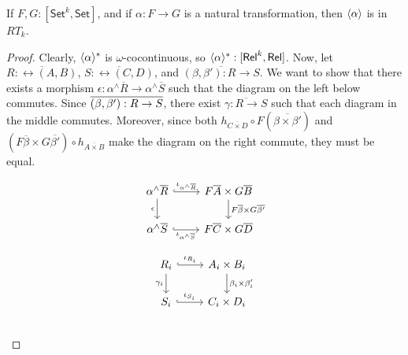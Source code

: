 \documentclass[runningheads]{llncs}
\newcommand{\set}{\mathsf{Set}}
\begin{document}
\begin{lemma}\label{lem:graph-reln-functors}
If $F,G : [\set^k,\set]$, and if $\alpha : F \to G$ is a natural
transformation, then $\langle {\alpha} \rangle$ is in $RT_k$.
\end{lemma}
\begin{proof}
Clearly, $\langle {\alpha} \rangle^*$ is $\omega$-cocontinuous, so
$\langle {\alpha} \rangle^* : [\mathsf{Rel}^k,\mathsf{Rel}]$. Now, let $\overline{R :
  \rel(A, B)}$, $\overline{S : \rel(C, D)}$, and $\overline{(\beta,
  \beta') : R \to S}$. We want to show that there exists a morphism
$\epsilon : \alpha^\wedge\overline{R} \to \alpha^\wedge\overline{S}$
such that the diagram on the left below commutes. Since
$\overline{(\beta,\beta') : R \to S}$, there exist $\overline{\gamma : R \to
  S}$ such that each diagram in the middle commutes.
Moreover, since both $h_{\overline{C \times D}} \circ
F(\overline{\beta \times \beta'})$ and $(F\overline{\beta} \times
G\overline{\beta'}) \circ h_{\overline{A \times B}}$ make the diagram
on the right commute, they must be equal.
\begin{figure*}[ht]
\vspace*{-0.1in}
  \hspace*{-0.85in}
  \begin{minipage}[b]{0.25\linewidth}
 {\small    \[
    \begin{tikzcd}
        \alpha^\wedge\overline{R}
        \ar[r, hookrightarrow, "{\iota_{\alpha^\wedge\overline{R}}}"]
        \ar[d, "{\epsilon}"']
        & F\overline{A} \times G\overline{B}
        \ar[d, "{F\overline{\beta} \times G\overline{\beta'}}"] \\
        \alpha^\wedge\overline{S}
        \ar[r, hookrightarrow, "{\iota_{\alpha^\wedge\overline{S}}}"']
        & F\overline{C} \times G\overline{D}
    \end{tikzcd}
    \]}
\end{minipage}
\begin{minipage}[b]{0.25\linewidth}
{\small    \[
    \begin{tikzcd}
        R_i
        \ar[d, "{\gamma_i}"']
        \ar[r, hookrightarrow, "{\iota_{R_i}}"]
        &A_i \times B_i
        \ar[d, "{\beta_i \times \beta'_i}"] \\
        S_i
        \ar[r, hookrightarrow, "{\iota_{S_i}}"]
        &C_i \times D_i
    \end{tikzcd}
    \]}
\end{minipage}
\begin{minipage}[b]{0.25\linewidth}
{\footnotesize \[
      \begin{tikzcd}[row sep = large]

\end{tikzcd}\]}
\end{minipage}
\end{figure*}
\end{proof}
\end{document}
